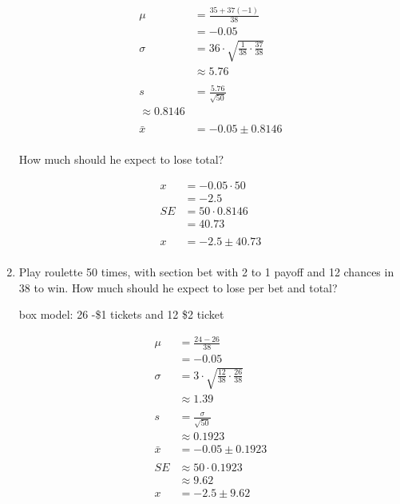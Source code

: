 \documentclass[letterpaper,landscape]{exam}
\begin{document}
\begin{enumerate}
\begin{solution}
        \begin{align*}
          \mu     & = \frac{35 + 37 (-1)}{38} \\
                  & = -0.05 \\
          \sigma  & = 36 \cdot \sqrt{\frac{1}{38} \cdot \frac{37}{38}} \\
                  & \approx 5.76 \\
          \\
          s &= \frac{5.76}{\sqrt{50}} \\
          \approx 0.8146 \\
          \\
          \bar{x} &= -0.05 \pm 0.8146 \\
        \end{align*}

      \end{solution}

      How much should he expect to lose total?
      \begin{solution}
        \begin{align*}
          x  & = -0.05 \cdot 50 \\
             & = -2.5 \\
          SE & = 50 \cdot 0.8146 \\
             & = 40.73 \\
          \\
          x &= -2.5 \pm 40.73 \\
        \end{align*}
      \end{solution}

    \item Play roulette 50 times, with section bet with 2 to 1 payoff and 12
      chances in 38 to win. How much should he expect to lose per bet and total?

      \begin{solution}
        box model: 26 -\$1 tickets and 12 \$2 ticket

        \begin{align*}
          \mu     & = \frac{24 - 26}{38} \\
                  & = -0.05 \\
          \sigma  & = 3 \cdot \sqrt{\frac{12}{38} \cdot \frac{26}{38}} \\
                  & \approx 1.39 \\
          \\
          s       & = \frac{\sigma}{\sqrt{50}} \\
                  & \approx 0.1923 \\
          \bar{x} & = -0.05 \pm 0.1923 \\
          \\
          SE & \approx 50 \cdot 0.1923 \\
             & \approx 9.62 \\
          x  & = -2.5 \pm 9.62 \\
        \end{align*}


\end{solution}
\end{enumerate}
\end{document}
